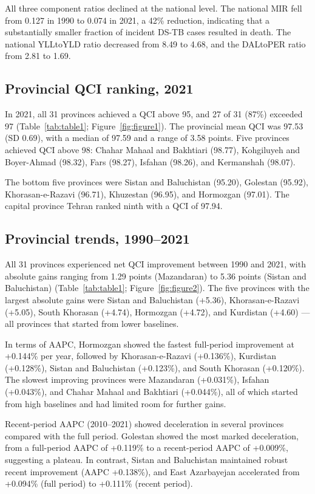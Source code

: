 \documentclass[12pt]{article}
\begin{document}
All three component ratios declined at the national level. The national MIR fell from 0.127 in 1990 to 0.074 in 2021, a 42\% reduction, indicating that a substantially smaller fraction of incident DS-TB cases resulted in death. The national YLLtoYLD ratio decreased from 8.49 to 4.68, and the DALtoPER ratio from 2.81 to 1.69.

\subsection{Provincial QCI ranking, 2021}

In 2021, all 31 provinces achieved a QCI above 95, and 27 of 31 (87\%) exceeded 97 (Table~\ref{tab:table1}; Figure~\ref{fig:figure1}). The provincial mean QCI was 97.53 (SD 0.69), with a median of 97.59 and a range of 3.58 points. Five provinces achieved QCI above 98: Chahar Mahaal and Bakhtiari (98.77), Kohgiluyeh and Boyer-Ahmad (98.32), Fars (98.27), Isfahan (98.26), and Kermanshah (98.07).

The bottom five provinces were Sistan and Baluchistan (95.20), Golestan (95.92), Khorasan-e-Razavi (96.71), Khuzestan (96.95), and Hormozgan (97.01). The capital province Tehran ranked ninth with a QCI of 97.94.

\subsection{Provincial trends, 1990--2021}

All 31 provinces experienced net QCI improvement between 1990 and 2021, with absolute gains ranging from 1.29 points (Mazandaran) to 5.36 points (Sistan and Baluchistan) (Table~\ref{tab:table1}; Figure~\ref{fig:figure2}). The five provinces with the largest absolute gains were Sistan and Baluchistan (+5.36), Khorasan-e-Razavi (+5.05), South Khorasan (+4.74), Hormozgan (+4.72), and Kurdistan (+4.60) --- all provinces that started from lower baselines.

In terms of AAPC, Hormozgan showed the fastest full-period improvement at +0.144\% per year, followed by Khorasan-e-Razavi (+0.136\%), Kurdistan (+0.128\%), Sistan and Baluchistan (+0.123\%), and South Khorasan (+0.120\%). The slowest improving provinces were Mazandaran (+0.031\%), Isfahan (+0.043\%), and Chahar Mahaal and Bakhtiari (+0.044\%), all of which started from high baselines and had limited room for further gains.

Recent-period AAPC (2010--2021) showed deceleration in several provinces compared with the full period. Golestan showed the most marked deceleration, from a full-period AAPC of +0.119\% to a recent-period AAPC of +0.009\%, suggesting a plateau. In contrast, Sistan and Baluchistan maintained robust recent improvement (AAPC +0.138\%), and East Azarbayejan accelerated from +0.094\% (full period) to +0.111\% (recent period).
\end{document}

